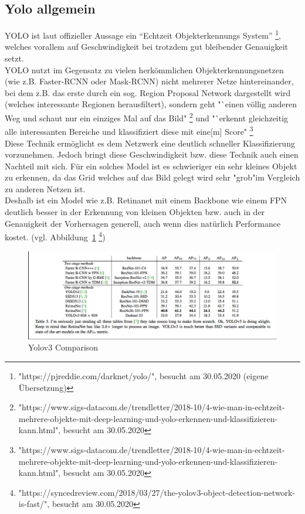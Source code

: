 \documentclass[a4paper,oneside,12pt]{report}
\begin{document}
\begin{onehalfspace}
		\subsection{Yolo allgemein}
		YOLO ist laut offizieller Aussage ein "`Echtzeit Objekterkennungs System"'
		\footnote{"https://pjreddie.com/darknet/yolo/", besucht am 30.05.2020 (eigene Übersetzung)},
		welches vorallem auf Geschwindigkeit bei trotzdem gut bleibender Genauigkeit setzt.\\
		YOLO nutzt im Gegensatz zu vielen herkömmlichen Objekterkennungsnetzen (wie z.B. Faster-RCNN oder Mask-RCNN) nicht mehrerer Netze hintereinander, bei dem z.B. das erste durch ein sog. Region Proposal Network dargestellt wird (welches interessante Regionen herausfiltert), sondern geht "`einen völlig anderen Weg und schaut nur ein einziges Mal auf das Bild"
		\footnote{"https://www.sigs-datacom.de/trendletter/2018-10/4-wie-man-in-echtzeit-mehrere-objekte-mit-deep-learning-und-yolo-erkennen-und-klassifizieren-kann.html", besucht am 30.05.2020}
		und "`erkennt gleichzeitig alle interessanten Bereiche und klassifiziert diese mit eine[m] Score"
		\footnote{"https://www.sigs-datacom.de/trendletter/2018-10/4-wie-man-in-echtzeit-mehrere-objekte-mit-deep-learning-und-yolo-erkennen-und-klassifizieren-kann.html", besucht am 30.05.2020}\\
		Diese Technik ermöglicht es dem Netzwerk eine deutlich schneller Klassifizierung vorzunehmen. \clearpage
		Jedoch bringt diese Geschwindigkeit bzw. diese Technik auch einen Nachteil mit sich. Für ein solches Model ist es schwieriger ein sehr kleines Objekt zu erkennen, da das Grid welches auf das Bild gelegt wird sehr "grob"\space im Vergleich zu anderen Netzen ist. \\
		Deshalb ist ein Model wie z.B. Retinanet mit einem Backbone wie einem FPN deutlich besser in der Erkennung von kleinen Objekten bzw. auch in der Genauigkeit der Vorhersagen generell, auch wenn dies natürlich Performance kostet. (vgl. Abbildung~\ref{fig:comparison}
		\footnote{"https://syncedreview.com/2018/03/27/the-yolov3-object-detection-network-is-fast/", besucht am 30.05.2020})\\
		\begin{figure}[h!]
			\includegraphics[width=\linewidth]{Comparison.png}
			\caption{Yolov3 Comparison}
			\label{fig:comparison}
		\end{figure}

\end{onehalfspace}
\end{document}
